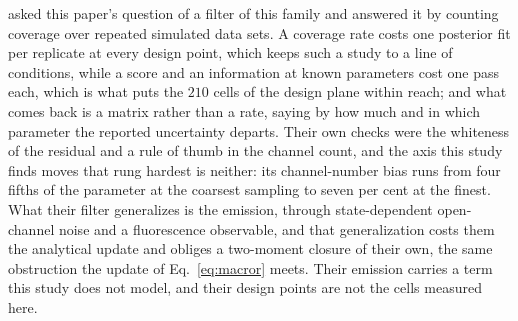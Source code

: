 \begin{appendixbox}
\citet{munch2022bayesian} asked this paper's question of a filter of this family and answered it by counting coverage over repeated simulated data sets. A coverage rate costs one posterior fit per replicate at every design point, which keeps such a study to a line of conditions, while a score and an information at known parameters cost one pass each, which is what puts the $210$ cells of the design plane within reach; and what comes back is a matrix rather than a rate, saying by how much and in which parameter the reported uncertainty departs. Their own checks were the whiteness of the residual and a rule of thumb in the channel count, and the axis this study finds moves that rung hardest is neither: its channel-number bias runs from four fifths of the parameter at the coarsest sampling to seven per cent at the finest. What their filter generalizes is the emission, through state-dependent open-channel noise and a fluorescence observable, and that generalization costs them the analytical update and obliges a two-moment closure of their own, the same obstruction the update of Eq.~\ref{eq:macror} meets. Their emission carries a term this study does not model, and their design points are not the cells measured here.


\end{appendixbox}

